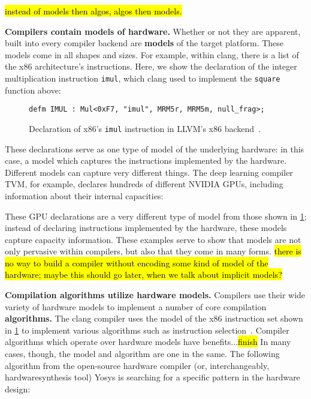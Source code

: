 \hl{instead of models then algos, algos then models.}


\textbf{Compilers contain
  models o}\textbf{f hardware.}
Whether or not they are apparent,
  built into every compiler backend
  are \textbf{models}
  of the target platform.
These models come in all shapes
  and sizes.
For example,
  within clang, there is a list
  of the x86 architecture's
  instructions.
Here,
  we show the declaration of
  the integer multiplication
  instruction
  \texttt{imul},
  which clang used to implement
  the \texttt{square} function above:
  
\begin{figure}[H]
    \centering
\begin{verbatim}
defm IMUL : Mul<0xF7, "imul", MRM5r, MRM5m, null_frag>;
\end{verbatim}
\caption{
Declaration of x86's
  \texttt{imul}
  instruction in LLVM's x86 
  backend~\cite{llvmx86tablegen}.
}
    \label{fig:intro:llvm-tablegen}
\end{figure}

\noindent
These declarations
  serve as one type of model
  of the underlying hardware:
  in this case, a model which captures
  the instructions
  implemented by the hardware.
Different models
  can capture very different things.
The deep learning compiler TVM,
  for example,
  declares 
  hundreds of different NVIDIA GPUs,
  including information
  about their internal capacities:



\noindent
These GPU declarations
  are a very different type of model
  from those shown in
  \cref{fig:intro:llvm-tablegen};
  instead of declaring instructions
  implemented by the hardware,
  these models capture
  capacity information.
These examples serve to show
  that models are not only pervasive
  within compilers,
  but also that
  they come in many forms.
\hl{there is no way to build a compiler
  without encoding some kind 
  of model of the hardware;
  maybe this should go later, when we talk about implicit models?}

\textbf{Compilation algorithms
  utilize hardware models.}
Compilers use their
  wide variety of
  hardware models
  to implement a number of core
  compilation
  \textbf{algorithms.}
The clang compiler uses 
  the model of the x86 instruction set
  shown in \cref{fig:intro:llvm-tablegen}
  to implement
  various algorithms
  such as instruction 
  selection~\cite{llvminstructionselection}.
Compiler algorithms
  which operate over hardware models
  have benefits...\hl{finish}
In many cases, though,
  the model and algorithm are 
  one in the same.
The following algorithm
  from the open-source hardware compiler
  (or, interchangeably,
    \gls{hardwaresynthesis} tool)
  Yosys
  is searching for a specific pattern 
  in the hardware design:

